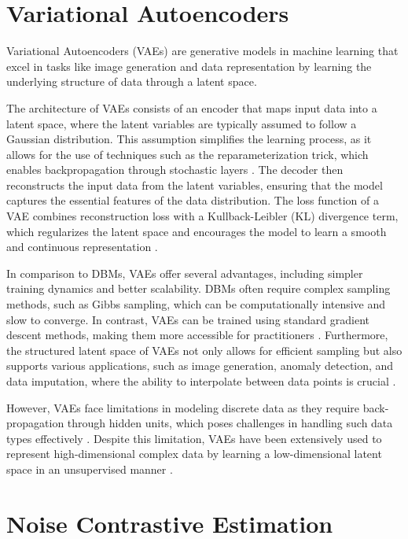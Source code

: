\section{Variational Autoencoders}
Variational Autoencoders (VAEs) are generative models in machine learning that excel in tasks like image generation and data 
representation by learning the underlying structure of data through a latent space. 

The architecture of VAEs consists of an encoder that maps input data into a latent space, where the latent variables are 
typically assumed to follow a Gaussian distribution. This assumption simplifies the learning process, as it allows for 
the use of techniques such as the reparameterization trick, which enables backpropagation through stochastic layers \citep{10.1561/2200000056}. 
The decoder then reconstructs the input data from the latent variables, ensuring that the model captures the essential 
features of the data distribution. The loss function of a VAE combines reconstruction loss with a Kullback-Leibler (KL) 
divergence term, which regularizes the latent space and encourages the model to learn a smooth and continuous representation \citep{10.3390/jimaging4020036}.

In comparison to DBMs, VAEs offer several advantages, including simpler training dynamics and better scalability. DBMs 
often require complex sampling methods, such as Gibbs sampling, which can be computationally intensive and slow to converge. 
In contrast, VAEs can be trained using standard gradient descent methods, making them more accessible for 
practitioners \citep{10.1561/2200000056}\citep{10.1109/access.2020.2977671}. Furthermore, the structured latent space of 
VAEs not only allows for efficient sampling but also supports various applications, such as image generation, anomaly detection, 
and data imputation, where the ability to interpolate between data points is crucial \citep{10.1088/2632-2153/ab80b7}\citep{10.48550/arxiv.2002.10464}.

However, VAEs face limitations in modeling discrete data as they require back-propagation through hidden units, which poses challenges 
in handling such data types effectively \citep{10.48550/arxiv.1909.13062}. Despite this limitation, VAEs have been extensively used to 
represent high-dimensional complex data by learning a low-dimensional latent space in an unsupervised manner \citep{10.48550/arxiv.2106.06500}.


\section{Noise Contrastive Estimation}


